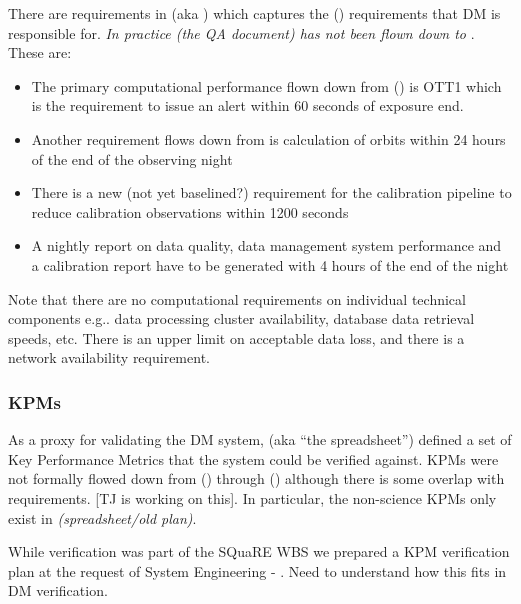 There are requirements in  (aka \DMSR) which captures the  (\OSS) requirements that DM is responsible for. \textit{In practice  (the QA document) has not been flown down to }. These are:

\begin{itemize}

\item The primary computational performance flown down from  (\LSR) is OTT1 which is the requirement to issue an alert within 60 seconds of exposure end.

\item Another requirement flows down from  is calculation of orbits within 24 hours of the end of the observing night

\item There is a new (not yet baselined?) requirement for the calibration pipeline to reduce calibration observations within 1200 seconds

\item A nightly report on data quality, data management system performance and a calibration report have to be generated with 4 hours of the end of the night

\end{itemize}

Note that there are no computational requirements on individual technical components e.g.. data processing cluster availability, database data retrieval speeds, etc. There is an upper limit on acceptable data loss, and there is a network availability requirement.

\subsubsection{KPMs}


As a proxy for validating the DM system,  (aka “the spreadsheet”) defined a set of Key Performance Metrics that the system could be verified against. KPMs were not formally flowed down from  (\LSR) through  (\OSS) although there is some overlap with  requirements. [TJ is working on this]. In particular, the non-science KPMs only exist in  \textit{(spreadsheet/old plan)}.

\begin{note}
While verification was part of the SQuaRE WBS we prepared a KPM verification plan at the request of System Engineering - . Need to understand how this fits in DM verification.
\end{note}

